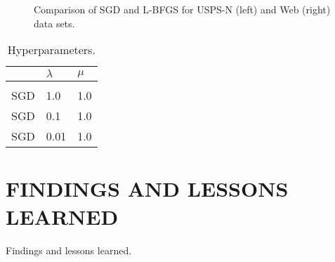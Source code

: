 \begin{figure}[h]
\vspace{1in}
\caption{Comparison of SGD and L-BFGS for USPS-N (left) and Web (right) data sets.}
\end{figure}

\begin{table}[t]
\caption{Hyperparameters.}
\label{tab-hyperparameters}
\begin{center}
\begin{tabular}{lll}
& $\lambda$  & $\mu$
\\ \hline \\
SGD & 1.0  & 1.0 \\
SGD & 0.1  & 1.0 \\
SGD & 0.01 & 1.0 \\
\end{tabular}
\end{center}
\end{table}



\section{FINDINGS AND LESSONS LEARNED}
\label{sec:conclusion}

Findings and lessons learned.








